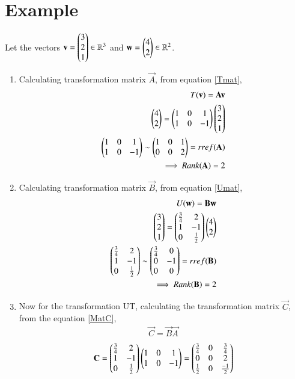\documentclass[journal,12pt,twocolumn]{IEEEtran}
\begin{document}
\section{Example}
Let the vectors $\mathbf{v}=\begin{pmatrix}3\\2\\1\end{pmatrix} \in \mathbb{R}^3$ and $\mathbf{w}=\begin{pmatrix}4\\2\end{pmatrix} \in \mathbb{R}^2$.
\begin{enumerate}
\item Calculating transformation matrix $\vec{A}$, from equation \eqref{Tmat}, 
\begin{align}
T(\mathbf{v})=\mathbf{A}\mathbf{v}\\
\begin{pmatrix}4\\2\end{pmatrix}=\begin{pmatrix}1&0&1\\1&0&-1\end{pmatrix}\begin{pmatrix}3\\2\\1\end{pmatrix}\\
\begin{pmatrix}1&0&1\\1&0&-1\end{pmatrix} \sim \begin{pmatrix}1&0&1\\0&0&2\end{pmatrix}=rref(\mathbf{A})\\
\implies Rank(\mathbf{A})=2 \label{RankA}
\end{align}
\item Calculating transformation matrix $\vec{B}$, from equation \eqref{Umat}, 
\begin{align}
U(\mathbf{w})=\mathbf{B}\mathbf{w}\\
\begin{pmatrix}3\\2\\1\end{pmatrix}=\begin{pmatrix}\frac{3}{4}&2\\1&-1\\0&\frac{1}{2}\end{pmatrix}\begin{pmatrix}4\\2\end{pmatrix}\\
\begin{pmatrix}\frac{3}{4}&2\\1&-1\\0&\frac{1}{2}\end{pmatrix} \sim \begin{pmatrix}\frac{3}{4}&0\\0&-1\\0&0\end{pmatrix}=rref(\mathbf{B})\\
\implies Rank(\mathbf{B})=2 \label{RankB}
\end{align}
\item Now for the transformation UT, calculating the transformation matrix $\vec{C}$, from the equation \eqref{MatC},
\begin{align}
\vec{C}=\vec{B}\vec{A}
\end{align}
\begin{align}
\vec{C}=\myvec{\frac{3}{4}&2\\1&-1\\0&\frac{1}{2}}\myvec{1&0&1\\1&0&-1}=\myvec{\frac{3}{4}&0&\frac{3}{4}\\0&0&2\\\frac{1}{2}&0&\frac{-1}{2}}\\

\end{align}
\end{enumerate}
\end{document}

